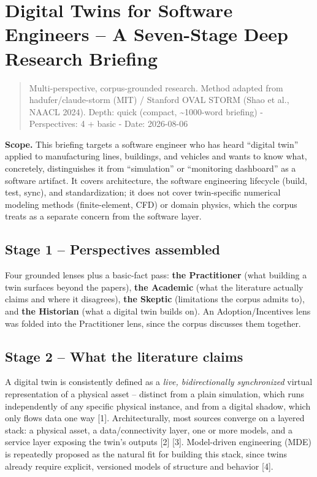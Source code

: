\documentclass[
  12pt,
  a4paper,
]{article}
\author{}
\date{}
\begin{document}
\section{Digital Twins for Software Engineers -- A Seven-Stage Deep
Research
Briefing}\label{digital-twins-for-software-engineers-a-seven-stage-deep-research-briefing}

\begin{quote}
Multi-perspective, corpus-grounded research. Method adapted from
hadufer/claude-storm (MIT) / Stanford OVAL STORM (Shao et al., NAACL
2024). Depth: quick (compact, \textasciitilde1000-word briefing) -
Perspectives: 4 + basic - Date: 2026-08-06
\end{quote}

\textbf{Scope.} This briefing targets a software engineer who has heard
``digital twin'' applied to manufacturing lines, buildings, and vehicles
and wants to know what, concretely, distinguishes it from ``simulation''
or ``monitoring dashboard'' as a software artifact. It covers
architecture, the software engineering lifecycle (build, test, sync),
and standardization; it does not cover twin-specific numerical modeling
methods (finite-element, CFD) or domain physics, which the corpus treats
as a separate concern from the software layer.

\subsection{Stage 1 -- Perspectives
assembled}\label{stage-1-perspectives-assembled}

Four grounded lenses plus a basic-fact pass: \textbf{the Practitioner}
(what building a twin surfaces beyond the papers), \textbf{the Academic}
(what the literature actually claims and where it disagrees),
\textbf{the Skeptic} (limitations the corpus admits to), and \textbf{the
Historian} (what a digital twin builds on). An Adoption/Incentives lens
was folded into the Practitioner lens, since the corpus discusses them
together.

\subsection{Stage 2 -- What the literature
claims}\label{stage-2-what-the-literature-claims}

A digital twin is consistently defined as a \emph{live, bidirectionally
synchronized} virtual representation of a physical asset -- distinct
from a plain simulation, which runs independently of any specific
physical instance, and from a digital shadow, which only flows data one
way {[}1{]}. Architecturally, most sources converge on a layered stack:
a physical asset, a data/connectivity layer, one or more models, and a
service layer exposing the twin's outputs {[}2{]} {[}3{]}. Model-driven
engineering (MDE) is repeatedly proposed as the natural fit for building
this stack, since twins already require explicit, versioned models of
structure and behavior {[}4{]}.
\end{document}
